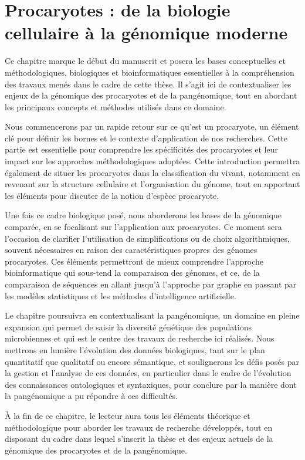 \part{Procaryotes : de la biologie cellulaire à la génomique moderne}

Ce chapitre marque le début du manuscrit et posera les bases conceptuelles et méthodologiques,  biologiques et bioinformatiques essentielles à la compréhension des travaux menés dans le cadre de cette thèse. Il s’agit ici de contextualiser les enjeux de la génomique des procaryotes et de la pangénomique, tout en abordant les principaux concepts et méthodes utilisés dans ce domaine.

Nous commencerons par un rapide retour sur ce qu'est un procaryote, un élément clé pour définir les bornes et le contexte d’application de nos recherches. Cette partie est essentielle pour comprendre les spécificités des procaryotes et leur impact sur les approches méthodologiques adoptées. Cette introduction permettra également de situer les procaryotes dans la classification du vivant, notamment en revenant sur la structure cellulaire et l'organisation du génome, tout en apportant les éléments pour discuter de la notion d'espèce procaryote.

Une fois ce cadre biologique posé, nous aborderons les bases de la génomique comparée, en se focalisant sur l'application aux procaryotes. Ce moment sera l’occasion de clarifier l’utilisation de simplifications ou de choix algorithmiques, souvent nécessaires en raison des caractéristiques propres des génomes procaryotes. Ces éléments permettront de mieux comprendre l’approche bioinformatique qui sous-tend la comparaison des génomes, et ce, de la comparaison de séquences en allant jusqu'à l'approche par graphe en passant par les modèles statistiques et les méthodes d'intelligence artificielle.

Le chapitre poursuivra en contextualisant la pangénomique, un domaine en pleine expansion qui permet de saisir la diversité génétique des populations microbiennes et qui est le centre des travaux de recherche ici réalisés. Nous mettrons en lumière l’évolution des données biologiques, tant sur le plan quantitatif que qualitatif ou encore sémantique, et soulignerons les défis posés par la gestion et l’analyse de ces données, en particulier dans le cadre de l’évolution des connaissances ontologiques et syntaxiques, pour conclure par la manière dont la pangénomique a pu répondre à ces difficultés.  

À la fin de ce chapitre, le lecteur aura tous les éléments théorique et méthodologique pour aborder les travaux de recherche développés, tout en disposant du cadre dans lequel s'inscrit la thèse et des enjeux actuels de la génomique des procaryotes et de la pangénomique.


